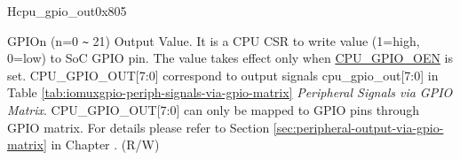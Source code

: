\begin{register}{H}{cpu\_gpio\_out}{0x805}\label{regdesc:GPIO_OUT}
%
%
%
%
%
%
%
%
%
\regnewline%
\begin{regdesc}\begin{reglist}
\label{fielddesc:GPIO_OUT}\item [CPU\_GPIO\_OUT] GPIOn (n=0 \verb+~+ 21) Output Value. It is a CPU CSR to write value (1=high, 0=low) to SoC GPIO pin. The value takes effect only when \hyperref[fielddesc:GPIO_OEN]{CPU\_GPIO\_OEN} is set.
\newline CPU\_GPIO\_OUT[7:0] correspond to output signals cpu\_gpio\_out[7:0] in Table \ref{tab:iomuxgpio-periph-signals-via-gpio-matrix} \textit{Peripheral Signals via GPIO Matrix}. 
\newline CPU\_GPIO\_OUT[7:0] can only be mapped to GPIO pins through GPIO matrix. For details please refer to Section \ref{sec:peripheral-output-via-gpio-matrix} in Chapter \textit{}. (R/W)
\end{reglist}\end{regdesc}
\end{register}

